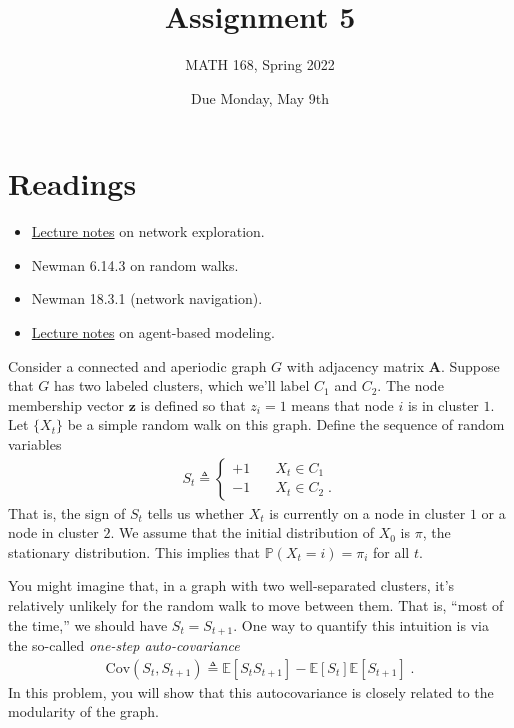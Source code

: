\documentclass{hw}
\title{Assignment 5}
\author{MATH 168, Spring 2022}
\date{Due Monday, May 9th}
\begin{document}
\section*{Readings}

\begin{itemize}
    \item \href{http://www.philchodrow.com/intro-networks/chapters/ranking_centrality.html}{Lecture notes} on network exploration.
    \item Newman 6.14.3 on random walks. 
    \item Newman 18.3.1 (network navigation).
    \item \href{http://www.philchodrow.com/intro-networks/chapters/agent_based_modeling.html}{Lecture notes} on agent-based modeling.
\end{itemize}



Consider a connected and aperiodic graph $G$ with adjacency matrix $\mathbf{A}$. 
Suppose that $G$ has two labeled clusters, which we'll label $C_1$ and $C_2$. 
The node membership vector $\mathbf{z}$ is defined so that $z_i = 1$ means that node $i$ is in cluster $1$. 
Let $\{X_t\}$ be a simple random walk on this graph. 
Define the sequence of random variables 
\begin{align}
    S_t \triangleq \begin{cases}
        +1 &\quad X_t \in C_1 \\ 
        -1 &\quad X_t \in C_2\;.
    \end{cases}
\end{align}
That is, the sign of $S_t$ tells us whether $X_t$ is currently on a node in cluster $1$ or a node in cluster $2$. 
We assume that the initial distribution of $X_0$ is $\pi$, the stationary distribution. 
This implies that $\mathbb{P}(X_t = i) = \pi_i$ for all $t$. 

You might imagine that, in a graph with two well-separated clusters, it's relatively unlikely for the random walk to move between them. 
That is, ``most of the time,'' we should have $S_t = S_{t+1}$. 
One way to quantify this intuition is via the so-called \emph{one-step auto-covariance} 
\begin{align}
    \mathrm{Cov}(S_t, S_{t+1}) \triangleq \mathbb{E}[S_tS_{t+1}] - \mathbb{E}[S_t]\mathbb{E}[S_{t+1}]\;. 
\end{align}
In this problem, you will show that this autocovariance is closely related to the modularity of the graph. 
\end{document}
